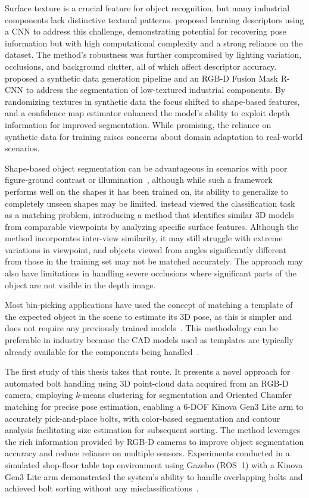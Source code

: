 Surface texture is a crucial feature for object recognition, but many industrial components lack
distinctive textural patterns. \citet{wohlhart2015learning} proposed learning descriptors using a
CNN to address this challenge, demonstrating potential for recovering pose information but with high
computational complexity and a strong reliance on the dataset. The method's robustness was further
compromised by lighting variation, occlusions, and background clutter, all of which affect
descriptor accuracy. \citet{back2020segmenting} proposed a synthetic data generation pipeline and
an RGB-D Fusion Mask R-CNN to address the segmentation of low-textured industrial components. By
randomizing textures in synthetic data the focus shifted to shape-based features, and a confidence
map estimator enhanced the model's ability to exploit depth information for improved segmentation.
While promising, the reliance on synthetic data for training raises concerns about domain adaptation
to real-world scenarios.

Shape-based object segmentation can be advantageous in scenarios with poor figure-ground contrast
or illumination~\citep{borenstein2006shape}, although while such a framework performs well on the
shapes it has been trained on, its ability to generalize to completely unseen shapes may be limited.
\citet{wohlkinger2011shape} instead viewed the classification task as a matching problem,
introducing a method that identifies similar 3D models from comparable viewpoints by analyzing
specific surface features. Although the method incorporates inter-view similarity, it may still
struggle with extreme variations in viewpoint, and objects viewed from angles significantly
different from those in the training set may not be matched accurately. The approach may also have
limitations in handling severe occlusions where significant parts of the object are not visible in
the depth image.

Most bin-picking applications have used the concept of matching a template of the expected object in
the scene to estimate its 3D pose, as this is simpler and does not require any previously trained
models~\citep{liu2012fast,guo2020fast,nguyen2022templates}. This methodology can be preferable in
industry because the CAD models used as templates are typically already available for the components
being handled~\citep{yan2020fastobjectpose}.

The first study of this thesis takes that route. It presents a novel approach for automated bolt
handling using 3D point-cloud data acquired from an RGB-D camera, employing $k$-means clustering
for segmentation and Oriented Chamfer matching for precise pose estimation, enabling a 6-DOF Kinova Gen3 Lite arm to accurately pick-and-place bolts, with color-based segmentation and contour analysis facilitating size estimation for subsequent sorting. The method leverages the rich information provided by RGB-D cameras to improve object segmentation accuracy and reduce reliance on multiple sensors. Experiments conducted in a simulated shop-floor table top environment using Gazebo (ROS~1) with a Kinova Gen3 Lite arm demonstrated the system's ability to handle overlapping bolts and achieved bolt sorting without any misclassifications~\citep{sk2024bolthandling}.

